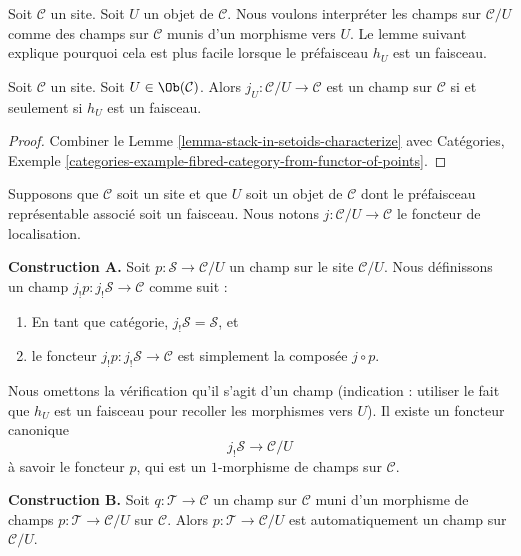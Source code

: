 \noindent
Soit $\mathcal{C}$ un site.
Soit $U$ un objet de $\mathcal{C}$.
Nous voulons interpréter les champs sur $\mathcal{C}/U$ comme des champs
sur $\mathcal{C}$ munis d'un morphisme vers $U$.
Le lemme suivant explique pourquoi cela est plus facile
lorsque le préfaisceau $h_U$ est un faisceau.

\begin{lemma}
\label{lemma-when-localization-stack}
Soit $\mathcal{C}$ un site. Soit $U \in \Ob(\mathcal{C})$.
Alors $j_U : \mathcal{C}/U \to \mathcal{C}$ est un champ sur $\mathcal{C}$
si et seulement si $h_U$ est un faisceau.
\end{lemma}

\begin{proof}
Combiner le
Lemme \ref{lemma-stack-in-setoids-characterize}
avec
Catégories,
Exemple \ref{categories-example-fibred-category-from-functor-of-points}.
\end{proof}

\noindent
Supposons que $\mathcal{C}$ soit un site
et que $U$ soit un objet de $\mathcal{C}$ dont le préfaisceau représentable
associé soit un faisceau. Nous notons $j : \mathcal{C}/U \to \mathcal{C}$
le foncteur de localisation.

\medskip\noindent
{\bf Construction A.} Soit $p : \mathcal{S} \to \mathcal{C}/U$ un champ
sur le site $\mathcal{C}/U$. Nous définissons un champ
$j_!p : j_!\mathcal{S} \to \mathcal{C}$ comme suit :
\begin{enumerate}
\item En tant que catégorie, $j_!\mathcal{S} = \mathcal{S}$, et
\item le foncteur $j_!p : j_!\mathcal{S} \to \mathcal{C}$
est simplement la composée $j \circ p$.
\end{enumerate}
Nous omettons la vérification qu'il s'agit d'un champ (indication : utiliser le fait que
$h_U$ est un faisceau pour recoller les morphismes vers $U$). Il existe un foncteur
canonique
$$
j_!\mathcal{S} \longrightarrow \mathcal{C}/U
$$
à savoir le foncteur $p$, qui est un $1$-morphisme de champs sur $\mathcal{C}$.

\medskip\noindent
{\bf Construction B.}
Soit $q : \mathcal{T} \to \mathcal{C}$ un champ sur $\mathcal{C}$
muni d'un morphisme de champs $p : \mathcal{T} \to \mathcal{C}/U$
sur $\mathcal{C}$. Alors $p : \mathcal{T} \to \mathcal{C}/U$
est automatiquement un champ sur $\mathcal{C}/U$.

